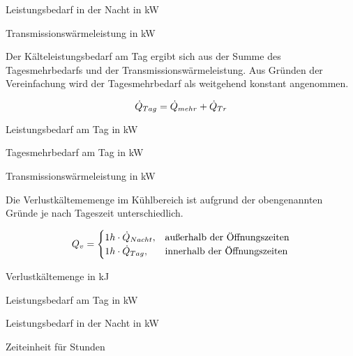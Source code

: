 \begin{description}[\dth]

	\item[$\pnacht$] Leistungsbedarf in der Nacht in kW
	\item[$\ptrans$] Transmissionswärmeleistung in kW

\end{description}
\vspace{0.5cm}


Der K\"alteleistungsbedarf am Tag ergibt sich aus der Summe des Tagesmehrbedarfs
und der Transmissionswärmeleistung. Aus Gründen der Vereinfachung wird der
Tagesmehrbedarf als weitgehend konstant angenommen.

\begin{equation}
	\ptag = \pmehr + \ptrans
\label{ptag}
\end{equation}

\begin{description}[\dth]

	\item[$\ptag$] Leistungsbedarf am Tag in kW
	\item[$\pmehr$] Tagesmehrbedarf am Tag in kW
	\item[$\ptrans$] Transmissionswärmeleistung in kW

\end{description}
\vspace{0.5cm}

Die Verlustk\"altememenge im K\"uhlbereich ist aufgrund der obengenannten
Gr\"unde je nach Tageszeit unterschiedlich.

\begin{equation}
	Q_v = \begin{cases}
	1h \cdot \pnacht, & \text{au\ss erhalb der \"Offnungszeiten}\\
	1h \cdot \ptag, & \text{innerhalb der \"Offnungszeiten}
	\end{cases}
\label{qv}
\end{equation}

\begin{description}[\dth]

	\item[$Q_v$] Verlustk\"altemenge in kJ
	\item[$\ptag$] Leistungsbedarf am Tag in kW
	\item[$\pnacht$] Leistungsbedarf in der Nacht in kW
	\item[$h$] Zeiteinheit f\"ur Stunden

\end{description}
\vspace{0.5cm}


